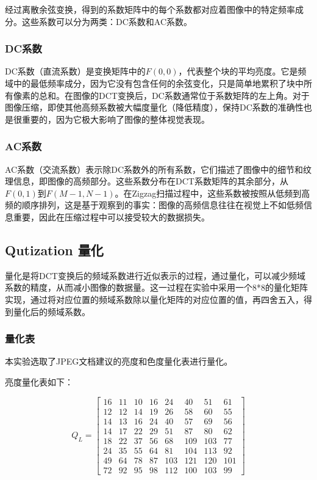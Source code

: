 \documentclass{article}
\begin{document}
经过离散余弦变换，得到的系数矩阵中的每个系数都对应着图像中的特定频率成分。这些系数可以分为两类：DC系数和AC系数。

\subsubsection{DC系数}

DC系数（直流系数）是变换矩阵中的$F(0,0)$，代表整个块的平均亮度。它是频域中的最低频率成分，因为它没有包含任何的余弦变化，只是简单地累积了块中所有像素的总和。在图像的DCT变换后，DC系数通常位于系数矩阵的左上角。对于图像压缩，即使其他高频系数被大幅度量化（降低精度），保持DC系数的准确性也是很重要的，因为它极大影响了图像的整体视觉表现。

\subsubsection{AC系数}

AC系数（交流系数）表示除DC系数外的所有系数，它们描述了图像中的细节和纹理信息，即图像的高频部分。这些系数分布在DCT系数矩阵的其余部分，从$F(0,1)$到$F(M-1,N-1)$。在Zigzag扫描过程中，这些系数被按照从低频到高频的顺序排列，这是基于观察到的事实：图像的高频信息往往在视觉上不如低频信息重要，因此在压缩过程中可以接受较大的数据损失。

\subsection{Qutization 量化}

量化是将DCT变换后的频域系数进行近似表示的过程，通过量化，可以减少频域系数的精度，从而减小图像的数据量。这一过程在实验中采用一个8*8的量化矩阵实现，通过将对应位置的频域系数除以量化矩阵的对应位置的值，再四舍五入，得到量化后的频域系数。


\subsubsection{量化表}

本实验选取了JPEG文档建议的亮度和色度量化表进行量化。

亮度量化表如下：

$$
Q_L=\begin{bmatrix}
16 & 11 & 10 & 16 & 24 & 40 & 51 & 61 \\
12 & 12 & 14 & 19 & 26 & 58 & 60 & 55 \\
14 & 13 & 16 & 24 & 40 & 57 & 69 & 56 \\
14 & 17 & 22 & 29 & 51 & 87 & 80 & 62 \\
18 & 22 & 37 & 56 & 68 & 109 & 103 & 77 \\
24 & 35 & 55 & 64 & 81 & 104 & 113 & 92 \\
49 & 64 & 78 & 87 & 103 & 121 & 120 & 101 \\
72 & 92 & 95 & 98 & 112 & 100 & 103 & 99
\end{bmatrix}
$$
\end{document}
